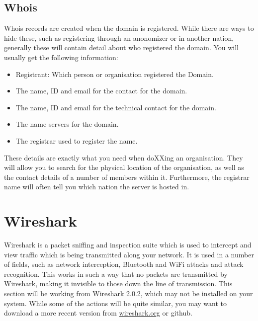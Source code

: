 		\subsection{Whois}
			Whois records are created when the domain is registered. 
			While there are ways to hide these, such as registering through an anonomizer or in another nation, generally these will contain detail about who registered the domain. 
			You will usually get the following information:
			\begin{itemize}
				\item Registrant: Which person or organisation registered the Domain. 
				\item The name, ID and email for the contact for the domain. 
				\item The name, ID and email for the technical contact for the domain.
				\item The name servers for the domain.
				\item The registrar used to register the name. 
			\end{itemize}
			These details are exactly what you need when doXXing an organisation. 
			They will allow you to search for the physical location of the organisation, as well as the contact details of a number of members within it. 
			Furthermore, the registrar name will often tell you which nation the server is hosted in. 
	\section{Wireshark}
		Wireshark is a packet sniffing and inspection suite which is used to intercept and view traffic which is being transmitted along your network.\cite{WSUG} 
		It is used in a number of fields, such as network interception, Bluetooth and WiFi attacks and attack recognition. 
		This works in such a way that no packets are transmitted by Wireshark, making it invisible to those down the line of transmission. 
		This section will be working from Wireshark 2.0.2, which may not be installed on your system. 
		While some of the actions will be quite similar, you may want to download a more recent version from \url{wireshark.org} or github.

